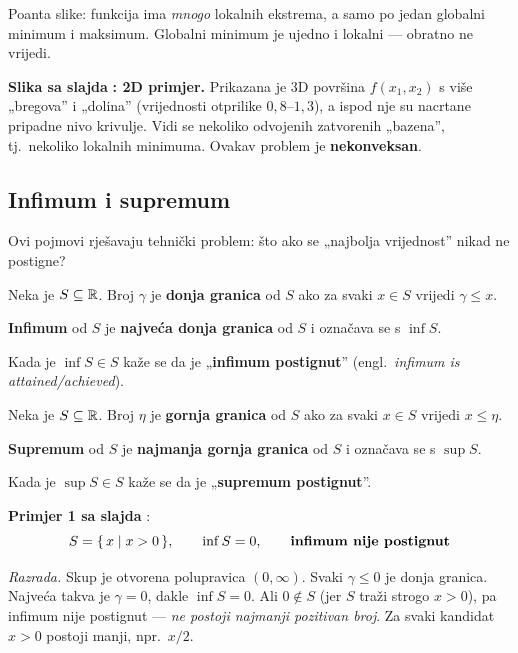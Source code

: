 Poanta slike: funkcija ima \emph{mnogo} lokalnih ekstrema, a samo po jedan
globalni minimum i maksimum. Globalni minimum je ujedno i lokalni --- obratno
ne vrijedi.

\textbf{Slika sa slajda} \textbf{: 2D primjer.} Prikazana je 3D
površina $f(x_1,x_2)$ s više „bregova” i „dolina” (vrijednosti otprilike
$0{,}8$--$1{,}3$), a ispod nje su nacrtane pripadne nivo krivulje. Vidi se
nekoliko odvojenih zatvorenih „bazena”, tj.\ nekoliko lokalnih minimuma. Ovakav
problem je \textbf{nekonveksan}.

\subsection{Infimum i supremum}

Ovi pojmovi rješavaju tehnički problem: što ako se „najbolja vrijednost” nikad
ne postigne?

\begin{definicija}[Infimum]
Neka je $S \subseteq \mathbb{R}$. Broj $\gamma$ je \textbf{donja granica} od $S$ ako za
svaki $x \in S$ vrijedi $\gamma \le x$.

\textbf{Infimum} od $S$ je \textbf{najveća donja granica} od $S$ i označava se
s $\inf S$.

Kada je $\inf S \in S$ kaže se da je „\textbf{infimum postignut}” (engl.\
\emph{infimum is attained/achieved}).
\end{definicija}

\begin{definicija}[Supremum]
Neka je $S \subseteq \mathbb{R}$. Broj $\eta$ je \textbf{gornja granica} od $S$ ako za
svaki $x \in S$ vrijedi $x \le \eta$.

\textbf{Supremum} od $S$ je \textbf{najmanja gornja granica} od $S$ i označava
se s $\sup S$.

Kada je $\sup S \in S$ kaže se da je „\textbf{supremum postignut}”.
\end{definicija}

\textbf{Primjer 1 sa slajda} :
\[
S = \{\, x \mid x > 0 \,\}, \qquad \inf S = 0, \qquad
\text{\textbf{infimum nije postignut}}
\]

\emph{Razrada.} Skup je otvorena polupravica $(0, \infty)$. Svaki $\gamma \le 0$
je donja granica. Najveća takva je $\gamma = 0$, dakle $\inf S = 0$. Ali
$0 \notin S$ (jer $S$ traži strogo $x > 0$), pa infimum nije postignut ---
\emph{ne postoji najmanji pozitivan broj}. Za svaki kandidat $x > 0$ postoji
manji, npr.\ $x/2$.

